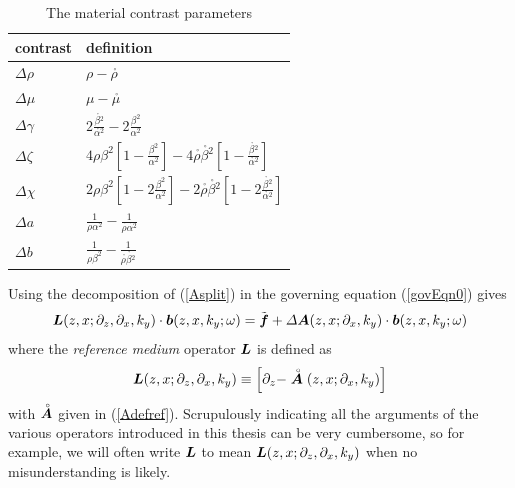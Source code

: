 \documentclass[11pt,a4paper]{article}
\newcommand{\bmi}[1]{\mbox{\boldmath$\mit #1$\unboldmath}}
\newcommand{\rf}[1]{\stackrel{\scriptscriptstyle _{\,\,\circ}}{ #1}}
\begin{document}
\begin{table}[h]
\begin{tabular*}{100mm}{ll}\hline
contrast & definition\\ \hline
 $ \Delta \rho$ & $\rho - {\rf \rho}$\\
 $ \Delta \mu$ & $\mu - {\rf \mu}$\\
 $ \Delta \gamma$ & $2{\frac{{ \rf \beta }{}^{2}}{{ \rf \alpha }{}^{2}}}-
 2{\frac{{\beta}^{2}}{{\alpha}^{2}}}$\\
$\Delta \zeta$ &$4 \rho{\beta
}^{2}\left[{1-{\frac{{\beta  }^{2}}{{\alpha}^{2}}}}\right]-4{\rf \rho}
{\rf \beta }{}^{  2}\left[{
 1-{\frac{{ \rf \beta }{}^{2}}{{\rf  \alpha }{}^{2}}}}\right]$\\
$\Delta \chi$ &$2 \rho {\beta}^{2}\left[{1-2{\frac{{ \beta
}^{2}}{{\alpha}^{2}}}}\right]-2{\rf \rho} {\rf \beta }{}^{  2}\left[{
 1-2{\frac{{\rf \beta }{}^{2}}{{\rf \alpha }{}^{2}}}}\right]$\\
$\Delta  a$ & ${\frac{1}{\rho{\alpha}^{2}}}-
 {\frac{1}{ {\rf \rho} {{\rf \alpha} }{}^{  2}}}$\\
$\Delta  b$ & ${\frac{1}{\rho{\beta}^{2}}}-
 {\frac{1}{ {\rf \rho} {{\rf \beta} }{}^{  2}}}$\\
 \hline
\end{tabular*}
\caption{\label{contrastTable} { The material contrast parameters}}
\end{table}

Using the decomposition of (\ref{Asplit}) in the governing equation (\ref{govEqn0}) gives
\begin{equation} \label{Leqn}
{\bmi L}(z,x;{\partial }_{z},{\partial }_{x},{k}_{y})\cdot{\bmi b}(z,x,k_y; \omega) =
\tilde{\bmi f} + {\mit \Delta} {\bmi A}(z,x;{\partial }_{x},{k}_{y})\cdot{\bmi b}(z,x,k_y; \omega)
\end{equation}
where the {\em reference medium\/} operator ${\bmi L}$ is defined as
\begin{equation} \label{Lref}
{\bmi L}(z,x;{\partial }_{z},{\partial }_{x},{k}_{y})\equiv
\left[\partial_{z}-\rf{\bmi A}(z,x;{\partial }_{x},{k}_{y})\right]
\end{equation}
with $\rf{\bmi A}$ given in (\ref{Adefref}).
Scrupulously indicating all the arguments of the various operators introduced in
this thesis can be very cumbersome, so for example, we will often write
${\bmi L}$ to mean ${\bmi
L}(z,x;{\partial }_{z},{\partial }_{x},{k}_{y})$ when no misunderstanding
is likely.

\newpage
\end{document}
